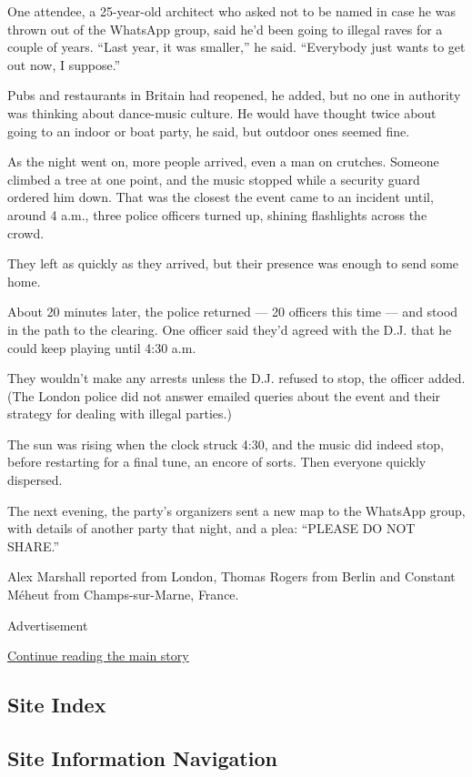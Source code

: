 One attendee, a 25-year-old architect who asked not to be named in case
he was thrown out of the WhatsApp group, said he'd been going to illegal
raves for a couple of years. ``Last year, it was smaller,'' he said.
``Everybody just wants to get out now, I suppose.''

Pubs and restaurants in Britain had reopened, he added, but no one in
authority was thinking about dance-music culture. He would have thought
twice about going to an indoor or boat party, he said, but outdoor ones
seemed fine.

As the night went on, more people arrived, even a man on crutches.
Someone climbed a tree at one point, and the music stopped while a
security guard ordered him down. That was the closest the event came to
an incident until, around 4 a.m., three police officers turned up,
shining flashlights across the crowd.

They left as quickly as they arrived, but their presence was enough to
send some home.

About 20 minutes later, the police returned --- 20 officers this time
--- and stood in the path to the clearing. One officer said they'd
agreed with the D.J. that he could keep playing until 4:30 a.m.

They wouldn't make any arrests unless the D.J. refused to stop, the
officer added. (The London police did not answer emailed queries about
the event and their strategy for dealing with illegal parties.)

The sun was rising when the clock struck 4:30, and the music did indeed
stop, before restarting for a final tune, an encore of sorts. Then
everyone quickly dispersed.

The next evening, the party's organizers sent a new map to the WhatsApp
group, with details of another party that night, and a plea: ``PLEASE DO
NOT SHARE.''

Alex Marshall reported from London, Thomas Rogers from Berlin and
Constant Méheut from Champs-sur-Marne, France.

Advertisement

\protect\hyperlink{after-bottom}{Continue reading the main story}

\hypertarget{site-index}{%
\subsection{Site Index}\label{site-index}}

\hypertarget{site-information-navigation}{%
\subsection{Site Information
Navigation}\label{site-information-navigation}}

